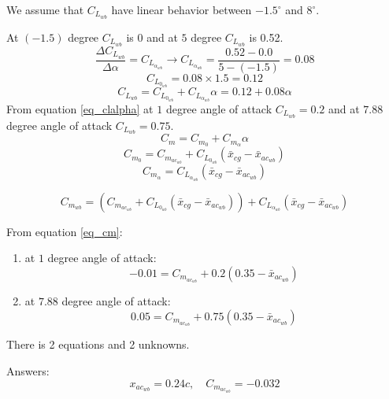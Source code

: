 We assume that $C_{L_{wb}}$ have linear behavior between $-1.5^{\circ}$ and $8^{\circ}$.


At $(-1.5)$ degree $C_{L_{wb}}$ is $0$ and at $5$ degree $C_{L_{wb}}$ is 0.52.
$$\dfrac{\Delta C_{L_{wb}}}{\Delta \alpha} = C_{L_{\alpha_{wb}}}\to C_{L_{\alpha_{wb}}} = \dfrac{0.52 - 0.0}{5 - (-1.5)} = 0.08$$
$$
C_{L_{0_{wb}}} = 0.08 \times 1.5 = 0.12
$$
\begin{equation}
C_{L_{wb}}= C_{L_{0_{wb}}}+C_{L_{\alpha_{wb}}}\alpha = 0.12 + 0.08\alpha
\label{eq_clalpha}
\end{equation}
From equation \ref{eq_clalpha} at $1$ degree angle of attack $C_{L_{wb}} = 0.2$ and at $7.88$ degree angle of attack $C_{L_{wb}} = 0.75$.
\begin{equation}
C_m = C_{m_0} + C_{m_\alpha}\alpha
\label{eq_cm}
\end{equation}
\begin{equation}
C_{m_0} = C_{m_{ac_{wb}}} + C_{L_{0_{wb}}}(\bar x_{cg} - \bar x_{ac_{wb}})
\end{equation}
\begin{equation}
C_{m_\alpha} = C_{L_{\alpha_{wb}}}(\bar x_{cg} - \bar x_{ac_{wb}})
\end{equation}


\begin{equation}
C_{m_{wb}} = (C_{m_{ac_{wb}}} + C_{L_{0_{wb}}}(\bar x_{cg} - \bar x_{ac_{wb}})) +
C_{L_{\alpha_{wb}}}(\bar x_{cg} - \bar x_{ac_{wb}})
\label{eq_cm}
\end{equation}


From equation \ref{eq_cm}:
\begin{enumerate}
    \item at $1$ degree angle of attack:
    $$-0.01 = C_{m_{ac_{wb}}}  + 0.2 (0.35-\bar x_{ac_{wb}}) $$
    \item at $7.88$ degree angle of attack:
    $$0.05 =C_{m_{ac_{wb}}} +  0.75(0.35-\bar x_{ac_{wb}}) $$
\end{enumerate}
There is 2 equations and 2 unknowns.

Answers:
$$x_{ac_{wb}} = 0.24c,\quad C_{m_{ac_{wb}}} = -0.032$$


